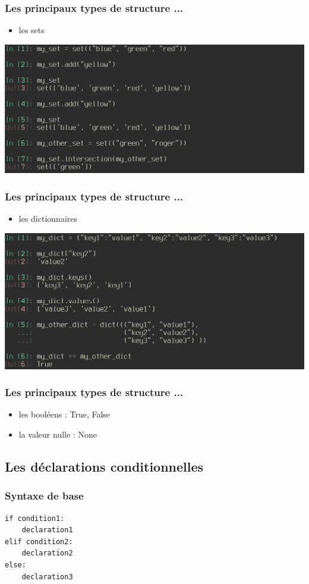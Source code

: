 \begin{frame}
  \frametitle{Les principaux types de structure ...}
    \begin{itemize}
      \item les sets
    \end{itemize}
    \includegraphics[scale=0.35]{type_set.png}
\end{frame}

\begin{frame}
  \frametitle{Les principaux types de structure ...}
    \begin{itemize}
      \item les dictionnaires
    \end{itemize}
    \includegraphics[scale=0.35]{type_dict.png}
\end{frame}

\begin{frame}
  \frametitle{Les principaux types de structure ...}
    \begin{itemize}
      \item les booléens : True, False
      \item la valeur nulle : None
    \end{itemize}
\end{frame}

\subsection{Les déclarations conditionnelles}
\begin{frame}[fragile]
  \frametitle{Syntaxe de base}
  \begin{lstlisting}
if condition1:
    declaration1
elif condition2:
    declaration2
else:
    declaration3
  \end{lstlisting}
\end{frame}

